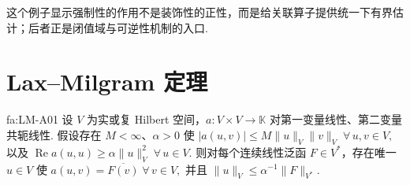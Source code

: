 这个例子显示强制性的作用不是装饰性的正性，而是给关联算子提供统一下有界估计；后者正是闭值域与可逆性机制的入口.

\section{Lax--Milgram 定理}\label{sec:ii15-lax-milgram}

\begin{FATheorem}{fa:LM-A01}
设 \(\displaystyle V\) 为实或复 Hilbert 空间，\(\displaystyle a:V\times V\to\mathbb K\) 对第一变量线性、第二变量共轭线性. 假设存在 \(\displaystyle M<\infty\)、\(\displaystyle\alpha>0\) 使 \(\displaystyle |a(u,v)| \leqslant M\|u\|_V\|v\|_V \; \forall\,u,v\in V,\)
以及 \(\displaystyle \operatorname{Re}a(u,u) \geqslant \alpha\|u\|_V^2 \; \forall\,u\in V.\)
则对每个连续线性泛函 \(\displaystyle F\in V^*\)，存在唯一 \(\displaystyle u\in V\) 使 \(\displaystyle a(u,v) = \overline{F(v)} \; \forall\,v\in V,\)
并且 \(\displaystyle \|u\|_V \leqslant \alpha^{-1}\|F\|_{V^*}.\)
\end{FATheorem}

